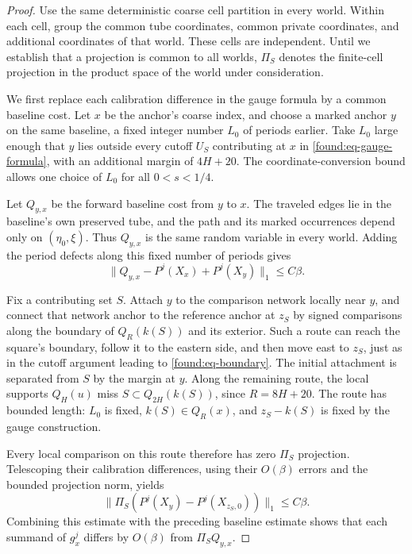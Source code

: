 \begin{proof}
Use the same deterministic coarse cell partition in every world.
Within each cell, group the common tube coordinates, common private
coordinates, and additional coordinates of that world.  These cells
are independent.  Until we establish that a projection is common to
all worlds, $\Pi_S$ denotes the finite-cell projection in the product
space of the world under consideration.

We first replace each calibration difference in the gauge formula by
a common baseline cost.  Let $x$ be the anchor's coarse index, and
choose a marked anchor $y$ on the same baseline, a fixed integer
number $L_0$ of periods earlier.  Take $L_0$ large enough that $y$
lies outside every cutoff $U_S$ contributing at $x$ in
\eqref{found:eq-gauge-formula}, with an additional margin of $4H+20$.
The coordinate-conversion bound allows one choice of $L_0$ for all
$0<s<1/4$.

Let $Q_{y,x}$ be the forward baseline cost from $y$ to $x$.  The
traveled edges lie in the baseline's own preserved tube, and the path
and its marked occurrences depend only on $(\eta_0,\xi)$.  Thus
$Q_{y,x}$ is the same random variable in every world.  Adding the
period defects along this fixed number of periods gives
\[
 \|Q_{y,x}-P^j(X_x)+P^j(X_y)\|_1\leq C\beta.
\]

Fix a contributing set $S$.  Attach $y$ to the comparison network
locally near $y$, and connect that network anchor to the reference
anchor at $z_S$ by signed comparisons along the boundary of
$Q_R(k(S))$ and its exterior.  Such a
route can reach the square's boundary, follow it to the eastern side,
and then move east to $z_S$, just as in the cutoff argument leading
to \eqref{found:eq-boundary}.  The initial attachment is separated
from $S$ by the margin at $y$.  Along the remaining route, the local
supports $Q_H(u)$ miss $S\subset Q_{2H}(k(S))$, since
$R=8H+20$.  The route has bounded length: $L_0$ is fixed,
$k(S)\in Q_R(x)$, and $z_S-k(S)$ is fixed by the gauge construction.

Every local comparison on this route therefore has zero $\Pi_S$
projection.  Telescoping their calibration differences, using their
$O(\beta)$ errors and the bounded projection norm, yields
\[
 \|\Pi_S(P^j(X_y)-P^j(X_{z_S,0}))\|_1\leq C\beta.
\]
Combining this estimate with the preceding baseline estimate shows
that each summand of $g_x^j$ differs by $O(\beta)$ from
$\Pi_SQ_{y,x}$.


\end{proof}
